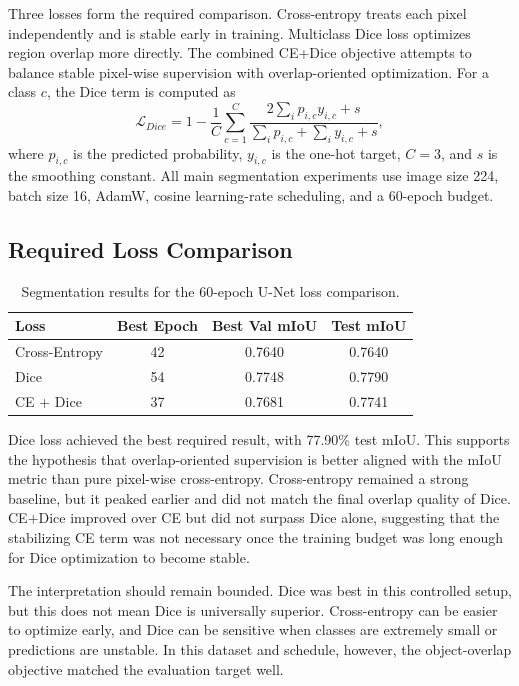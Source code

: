 \documentclass[10pt,twocolumn]{article}
\begin{document}
Three losses form the required comparison. Cross-entropy treats each pixel independently and is stable early in training. Multiclass Dice loss optimizes region overlap more directly. The combined CE+Dice objective attempts to balance stable pixel-wise supervision with overlap-oriented optimization. For a class $c$, the Dice term is computed as
\begin{equation}
\mathcal{L}_{Dice}=1-\frac{1}{C}\sum_{c=1}^{C}
\frac{2\sum_i p_{i,c}y_{i,c}+s}{\sum_i p_{i,c}+\sum_i y_{i,c}+s},
\end{equation}
where $p_{i,c}$ is the predicted probability, $y_{i,c}$ is the one-hot target, $C=3$, and $s$ is the smoothing constant. All main segmentation experiments use image size 224, batch size 16, AdamW, cosine learning-rate scheduling, and a 60-epoch budget.

\subsection{Required Loss Comparison}

\begin{table}[H]
\centering
\caption{Segmentation results for the 60-epoch U-Net loss comparison.}
\label{tab:segmentation}
\small
\begin{tabular}{lccc}
\toprule
Loss & Best Epoch & Best Val mIoU & Test mIoU\\
\midrule
Cross-Entropy & 42 & 0.7640 & 0.7640\\
Dice & 54 & 0.7748 & 0.7790\\
CE + Dice & 37 & 0.7681 & 0.7741\\
\bottomrule
\end{tabular}
\end{table}

Dice loss achieved the best required result, with 77.90\% test mIoU. This supports the hypothesis that overlap-oriented supervision is better aligned with the mIoU metric than pure pixel-wise cross-entropy. Cross-entropy remained a strong baseline, but it peaked earlier and did not match the final overlap quality of Dice. CE+Dice improved over CE but did not surpass Dice alone, suggesting that the stabilizing CE term was not necessary once the training budget was long enough for Dice optimization to become stable.

The interpretation should remain bounded. Dice was best in this controlled setup, but this does not mean Dice is universally superior. Cross-entropy can be easier to optimize early, and Dice can be sensitive when classes are extremely small or predictions are unstable. In this dataset and schedule, however, the object-overlap objective matched the evaluation target well.
\end{document}
